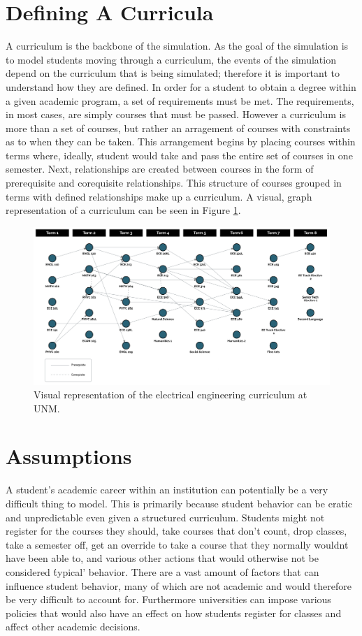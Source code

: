 \documentclass[botnum, fleqn]{unmeethesis}
\begin{document}
\section{Defining A Curricula}
A curriculum is the backbone of the simulation. As the goal of the simulation is to model students moving through a curriculum, the events of the simulation depend on the curriculum that is being simulated; therefore it is important to understand how they are defined. In order for a student to obtain a degree within a given academic program, a set of requirements must be met. The requirements, in most cases, are simply courses that must be passed. However a curriculum is more than a set of courses, but rather an arragement of courses with constraints as to when they can be taken. This arrangement begins by placing courses within terms where, ideally, student would take and pass the entire set of courses in one semester. Next, relationships are created between courses in the form of prerequisite and corequisite relationships. This structure of courses grouped in terms with defined relationships make up a curriculum. A visual, graph representation of a curriculum can be seen in Figure \ref{fig:curriculum_example}.

\begin{figure}[h!]
\centerline{\includegraphics[scale=0.4]{./figures/curriculum_example.jpg}}
\caption{Visual representation of the electrical engineering curriculum at UNM.} 
\label{fig:curriculum_example}
\end{figure}


\section{Assumptions}
A student's academic career within an institution can potentially be a very difficult thing to model. This is primarily because student behavior can be eratic and unpredictable even given a structured curriculum. Students might not register for the courses they should, take courses that don't count, drop classes, take a semester off, get an override to take a course that they normally wouldnt have been able to, and various other actions that would otherwise not be considered \'typical' behavior. There are a vast amount of factors that can influence student behavior, many of which are not academic and would therefore be very difficult to account for. Furthermore universities can impose various policies that would also have an effect on how students register for classes and affect other academic decisions. 
\end{document}
